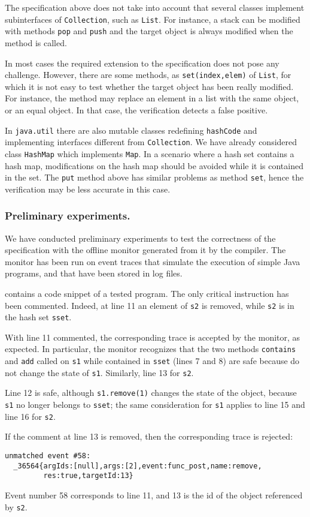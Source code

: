 The specification above does not take into account that several classes implement subinterfaces of \lstinline{Collection}, such as \lstinline{List}.
For instance, a stack can be modified with methods \lstinline{pop} and \lstinline{push} and the target object is always modified when the method is called.

In most cases the required extension to the specification does not pose any challenge. However, there are some methods, as
\lstinline{set(index,elem)} of \lstinline{List}, for which it is not easy to test whether the target object has been really modified.
For instance, the method
may replace an element in a list with the same object, or an equal object. In that case, the verification detects a false positive.

In \lstinline{java.util} there are also mutable classes redefining \lstinline{hashCode} and implementing interfaces different from
\lstinline{Collection}. We have already considered class \lstinline{HashMap} which implements \lstinline{Map}. In a scenario where
a hash set contains a hash map, modifications on the hash map should be avoided while it is contained in the set.
The \lstinline{put} method above has similar problems as method \lstinline{set}, hence the verification may be less accurate in this case.

\subsubsection*{Preliminary experiments.}
We have conducted preliminary experiments to test the correctness of the specification
with the offline monitor generated from it by the \rml compiler.
The monitor has been run on event traces that simulate the  execution of simple Java programs, and that have been stored in log files.

 contains a code snippet of a tested program. The only critical instruction has been commented.
Indeed, at line 11 an element of \lstinline{s2} is removed, while \lstinline{s2} is in the hash set \lstinline{sset}.

With line 11 commented, the corresponding trace is accepted by the monitor, as expected.
In particular, the monitor recognizes that the two methods \lstinline{contains} and \lstinline{add} called on \lstinline{s1}
while contained in \lstinline{sset} (lines 7 and 8) are safe because do not change the state of \lstinline{s1}. Similarly, line 13 for
\lstinline{s2}.

Line 12 is safe, although \lstinline{s1.remove(1)} changes the state of the object, because \lstinline{s1} no longer belongs to
\lstinline{sset}; the same consideration for \lstinline{s1} applies to line 15 and line 16 for \lstinline{s2}. 

If the comment at line 13 is removed, then the corresponding trace is rejected:
\begin{lstlisting}[language={},basicstyle=\ttfamily\scriptsize]
unmatched event #58:
  _36564{argIds:[null],args:[2],event:func_post,name:remove,
         res:true,targetId:13}
\end{lstlisting}
Event number 58 corresponds to line 11, and 13 is the id of the object referenced by \lstinline{s2}.   
